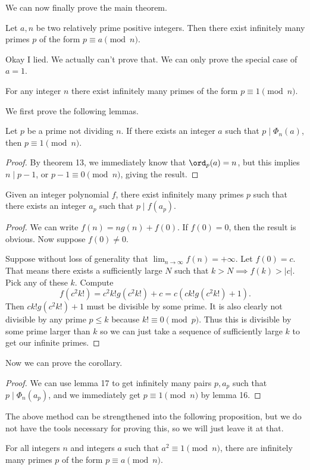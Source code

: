 \documentclass{article}
\begin{document}
We can now finally prove the main theorem.

\begin{thm}[Dirichlet]
Let $a, n$ be two relatively prime positive integers. Then there exist
infinitely many primes $p$ of the form $p \equiv a \pmod{n}$.
\end{thm}

Okay I lied. We actually can't prove that. We can only prove the special case of
$a = 1$.

\begin{cor}[Dirichlet]
For any integer $n$ there exist infinitely many primes of the form $p \equiv 1
\pmod{n}$.
\end{cor}

We first prove the following lemmas.

\begin{lem}
Let $p$ be a prime not dividing $n$. If there exists an integer $a$ such that $p
\mid \Phi_n(a)$, then $p \equiv 1 \pmod{n}$.
\end{lem}

\begin{proof}
By theorem 13, we immediately know that $\ord_p(a) = n$, but this implies $n
\mid p - 1$, or $p - 1 \equiv 0 \pmod{n}$, giving the result.
\end{proof}

\begin{lem}[Schur]
Given an integer polynomial $f$, there exist infinitely many primes $p$ such
that there exists an integer $a_p$ such that $p \mid f(a_p)$.
\end{lem}

\begin{proof}
We can write $f(n) = n g(n) + f(0)$. If $f(0) = 0$, then the result is obvious.
Now suppose $f(0) \neq 0$.

Suppose without loss of generality that $\lim_{n \to \infty} f(n) = +\infty$.
Let $f(0) = c$. That means there exists a sufficiently large $N$ such that $k >
N \implies f(k) > |c|$. Pick any of these $k$. Compute
\[ f(c^2 k!) = c^2 k! g(c^2 k!) + c = c (c k! g(c^2 k!) + 1). \]
Then $c k! g(c^2 k!) + 1$ must be divisible by some prime. It is also clearly
not divisible by any prime $p \leq k$ because $k! \equiv 0 \pmod{p}$. Thus this
is divisible by some prime larger than $k$ so we can just take a sequence of
sufficiently large $k$ to get our infinite primes.
\end{proof}

Now we can prove the corollary.

\begin{proof}
We can use lemma 17 to get infinitely many pairs $p, a_p$ such that $p \mid
\Phi_n(a_p)$, and we immediately get $p \equiv 1 \pmod{n}$ by lemma 16.
\end{proof}

The above method can be strengthened into the following proposition, but we do
not have the tools necessary for proving this, so we will just leave it at that.

\begin{prop}
For all integers $n$ and integers $a$ such that $a^2 \equiv 1 \pmod{n}$, there
are infinitely many primes $p$ of the form $p \equiv a \pmod{n}$.
\end{prop}
\end{document}
